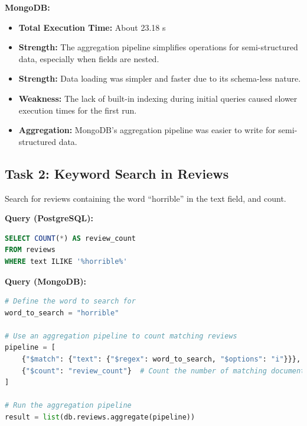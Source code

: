 \documentclass[12pt]{article}
\begin{document}
\textbf{MongoDB:}
\begin{itemize}
\item \textbf{Total Execution Time:} About 23.18 s
\item \textbf{Strength: } The aggregation pipeline simplifies operations for semi-structured data, especially when fields are nested.
\item \textbf{Strength:} Data loading was simpler and faster due to its schema-less nature.
\item \textbf{Weakness:} The lack of built-in indexing during initial queries caused slower execution times for the first run.
\item \textbf{Aggregation: }MongoDB’s aggregation pipeline was easier to write for semi-structured data.
\end{itemize}



\subsection*{Task 2: Keyword Search in Reviews}
Search for reviews containing the word “horrible” in the text field, and count. \newline

\textbf{Query (PostgreSQL):}
\begin{lstlisting}[language=SQL]
SELECT COUNT(*) AS review_count
FROM reviews
WHERE text ILIKE '%horrible%'
\end{lstlisting}

\textbf{Query (MongoDB):}
\begin{lstlisting}[language=python]
# Define the word to search for
word_to_search = "horrible"

# Use an aggregation pipeline to count matching reviews
pipeline = [
    {"$match": {"text": {"$regex": word_to_search, "$options": "i"}}},  # Case-insensitive regex match
    {"$count": "review_count"}  # Count the number of matching documents
]

# Run the aggregation pipeline
result = list(db.reviews.aggregate(pipeline))
\end{lstlisting}

\newpage
\end{document}
